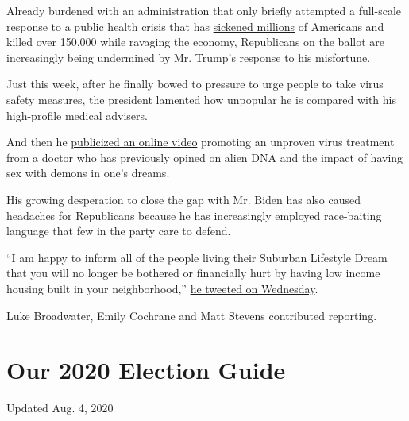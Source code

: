 Already burdened with an administration that only briefly attempted a
full-scale response to a public health crisis that has
\href{https://www.nytimes.com/interactive/2020/us/coronavirus-us-cases.html}{sickened
millions} of Americans and killed over 150,000 while ravaging the
economy, Republicans on the ballot are increasingly being undermined by
Mr. Trump's response to his misfortune.

Just this week, after he finally bowed to pressure to urge people to
take virus safety measures, the president lamented how unpopular he is
compared with his high-profile medical advisers.

And then he
\href{https://www.nytimes.com/2020/07/28/technology/virus-video-trump.html}{publicized
an online video} promoting an unproven virus treatment from a doctor who
has previously opined on alien DNA and the impact of having sex with
demons in one's dreams.

His growing desperation to close the gap with Mr. Biden has also caused
headaches for Republicans because he has increasingly employed
race-baiting language that few in the party care to defend.

``I am happy to inform all of the people living their Suburban Lifestyle
Dream that you will no longer be bothered or financially hurt by having
low income housing built in your neighborhood,''
\href{https://www.nytimes.com/2020/07/29/us/politics/trump-suburbs-housing-white-voters.html}{he
tweeted on Wednesday}.

Luke Broadwater, Emily Cochrane and Matt Stevens contributed reporting.

\hypertarget{our-2020-election-guide}{%
\section{Our 2020 Election Guide}\label{our-2020-election-guide}}

Updated Aug. 4, 2020

